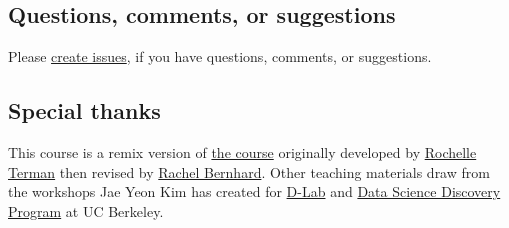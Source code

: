 \documentclass[
]{article}
\begin{document}
\hypertarget{questions-comments-or-suggestions}{%
\subsection{Questions, comments, or
suggestions}\label{questions-comments-or-suggestions}}

Please \href{https://github.com/jaeyk/PS239T/issues}{create issues}, if
you have questions, comments, or suggestions.

\hypertarget{special-thanks}{%
\subsection{Special thanks}\label{special-thanks}}

This course is a remix version of
\href{https://github.com/rochelleterman/PS239T}{the course} originally
developed by \href{http://rochelleterman.com/}{Rochelle Terman} then
revised by \href{http://rachelbernhard.com/}{Rachel Bernhard}. Other
teaching materials draw from the workshops Jae Yeon Kim has created for
\href{https://dlab.berkeley.edu/}{D-Lab} and
\href{https://data.berkeley.edu/research/discovery-program-home}{Data
Science Discovery Program} at UC Berkeley.
\end{document}

